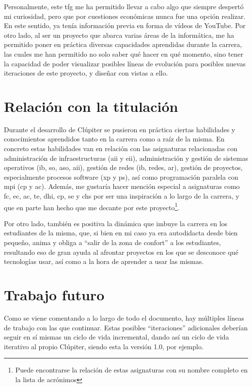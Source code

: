 Personalmente, este \acrshort{tfg} me ha permitido llevar a cabo algo que siempre despertó mi curiosidad, pero que por cuestiones económicas nunca fue una opción realizar. En este sentido, ya tenía información previa en forma de vídeos de YouTube. Por otro lado, al ser un proyecto que abarca varias áreas de la informática, me ha permitido poner en práctica diversas capacidades aprendidas durante la carrera, las cuales me han permitido no solo saber qué hacer en qué momento, sino tener la capacidad de poder visualizar posibles líneas de evolución para posibles nuevas iteraciones de este proyecto, y diseñar con vistas a ello.

\section{Relación con la titulación}
Durante el desarrollo de Clúpiter se pusieron en práctica ciertas habilidades y conocimientos aprendidos tanto en la carrera como a raíz de la misma. En concreto estas habilidades van en relación con las asignaturas relacionadas con administración de infraestructuras (\acrshort{aii} y \acrshort{eii}), administración y gestión de sistemas operativos (\acrshort{ib}, \acrshort{so}, \acrshort{aso}, \acrshort{aii}), gestión de redes (\acrshort{ib}, redes, \acrshort{ar}), gestión de proyectos, especialmente procesos software (\acrshort{xp} y \acrshort{ps}), así como programación paralela con \acrshort{mpi} (\acrshort{cp} y \acrshort{ac}). Además, me gustaría hacer mención especial a asignaturas como \acrshort{fc}, \acrshort{ec}, \acrshort{ac}, \acrshort{te}, \acrshort{dhi}, \acrshort{cp}, \acrshort{se} y \acrshort{chs} por ser una inspiración a lo largo de la carrera, y que en parte han hecho que me decante por este proyecto\footnote{Puede encontrarse la relación de estas asignaturas con su nombre completo en la lista de acrónimos}.

Por otro lado, también es positiva la dinámica que imbuye la carrera en los estudiantes de la misma, que, si bien en mi caso ya era autodidacta desde bien pequeño, anima y obliga a ``salir de la zona de confort'' a los estudiantes, resultando eso de gran ayuda al afrontar proyectos en los que se desconoce qué tecnologías usar, así como a la hora de aprender a usar las mismas.

\section{Trabajo futuro}
Como se viene comentando a lo largo de todo el documento, hay múltiples líneas de trabajo con las que continuar. Estas posibles ``iteraciones'' adicionales deberían seguir en sí mismas un ciclo de vida incremental, dando así un ciclo de vida iterativo al propio Clúpiter, siendo esta la versión 1.0, por ejemplo.

